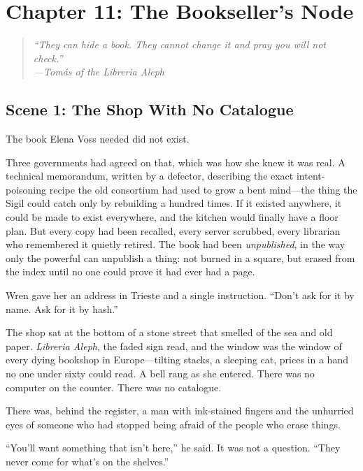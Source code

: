 \hypertarget{chapter-11-the-booksellers-node}{%
\section{Chapter 11: The Bookseller's
Node}\label{chapter-11-the-booksellers-node}}

\begin{quote}
\itshape ``They can hide a book. They cannot change it and pray you will not
check.''\\
\normalfont\hfill---Tom\'as of the Libreria Aleph
\end{quote}

\hypertarget{scene-1-the-shop-with-no-catalogue}{%
\subsection{Scene 1: The Shop With No
Catalogue}\label{scene-1-the-shop-with-no-catalogue}}

The book Elena Voss needed did not exist.

Three governments had agreed on that, which was how she knew it was real. A
technical memorandum, written by a defector, describing the exact intent-poisoning
recipe the old consortium had used to grow a bent mind---the thing the Sigil could
catch only by rebuilding a hundred times. If it existed anywhere, it could be made
to exist everywhere, and the kitchen would finally have a floor plan. But every
copy had been recalled, every server scrubbed, every librarian who remembered it
quietly retired. The book had been \emph{unpublished}, in the way only the powerful
can unpublish a thing: not burned in a square, but erased from the index until no
one could prove it had ever had a page.

Wren gave her an address in Trieste and a single instruction. ``Don't ask for it
by name. Ask for it by hash.''

The shop sat at the bottom of a stone street that smelled of the sea and old paper.
\emph{Libreria Aleph}, the faded sign read, and the window was the window of every
dying bookshop in Europe---tilting stacks, a sleeping cat, prices in a hand no one
under sixty could read. A bell rang as she entered. There was no computer on the
counter. There was no catalogue.

There was, behind the register, a man with ink-stained fingers and the unhurried
eyes of someone who had stopped being afraid of the people who erase things.

``You'll want something that isn't here,'' he said. It was not a question. ``They
never come for what's on the shelves.''


